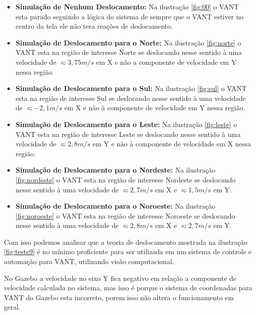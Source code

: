 \begin{itemize}
	\item \textbf{Simulação de Nenhum Deslocamento:} Na ilustração \ref{fig:00} o VANT esta parado seguindo a lógica do sistema de sempre que o VANT estiver no centro da tela ele não tera reações de deslocamento.
	
	\item \textbf{Simulação de Deslocamento para o Norte:} Na ilustração \ref{fig:norte} o VANT esta na região de interesse Norte se deslocando nesse sentido à uma velocidade de $\displaystyle \eqsim3,75m/s$ em X e não a componente de velocidade em Y nessa região. 
	
	\item \textbf{Simulação de Deslocamento para o Sul:} Na ilustração \ref{fig:sul} o VANT esta na região de interesse Sul se deslocando nesse sentido à uma velocidade de $\displaystyle \eqsim-2,1m/s$ em X e não à componente de velocidade em Y nessa região. 
	
	\item \textbf{Simulação de Deslocamento para o Leste:} Na ilustração \ref{fig:leste} o VANT esta na região de interesse Leste se deslocando nesse sentido à uma velocidade de $\displaystyle \eqsim2,8m/s$ em Y e não à componente de velocidade em X nessa região.
	
	\item \textbf{Simulação de Deslocamento para o Nordeste:} Na ilustração \ref{fig:nordeste} o VANT esta na região de interesse Nordeste se deslocando nesse sentido à uma velocidade de $\displaystyle \eqsim2,7m/s$ em X e $\displaystyle \eqsim1,5m/s$ em Y.
	
	\item \textbf{Simulação de Deslocamento para o Noroeste:} Na ilustração \ref{fig:noroeste} o VANT esta na região de interesse Noroeste se deslocando nesse sentido à uma velocidade de $\displaystyle \eqsim2,8m/s$ em X e $\displaystyle \eqsim2,7m/s$ em Y.
\end{itemize}

Com isso podemos analisar que a teoria de deslocamento mostrada na ilustração \ref{fig:teste9} é no mínimo proficiente para ser utilizada em um sistema de controle e automação para VANT, utilizando visão computacional. 
 
No Gazebo a velocidade no eixo Y fica negativo em relação a componente de velocidade calculada no sistema, mas isso é porque o sistema de coordenadas para VANT do Gazebo esta incorreto, porem isso não altera o funcionamento em geral.
 
